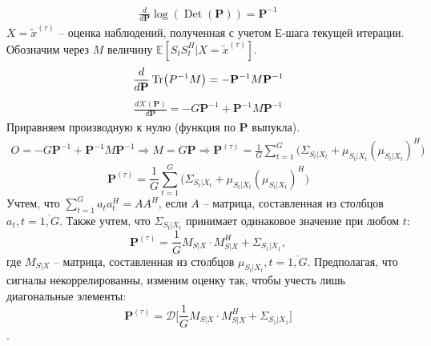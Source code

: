 \documentclass[11pt]{article}
\newcommand{\Expect}{\mathbb{E}}
\DeclareMathOperator{\Det}{Det}
\begin{document}
\begin{equation*}
\begin{gathered}
\frac{d}{d\mathbf{P}}\log (\Det (\mathbf{P})) = \mathbf{P}^{-1}
\end{gathered}
\end{equation*}
$X = \widetilde{x}^{(\tau)}$ -- оценка наблюдений, полученная с учетом Е-шага текущей итерации.
Обозначим через $M$ величину $\Expect[S_t S_t^H\Big| X = \widetilde{x}^{(\tau)}]$.
\begin{equation*}
\begin{gathered}
\frac{d}{d\mathbf{P}}\Tr(P^{-1}M)= -\mathbf{P}^{-1}M\mathbf{P}^{-1}
\end{gathered}
\end{equation*}
\begin{equation*}
\begin{gathered}
\frac{d\mathcal{K}(\mathbf{P})}{d\mathbf{P}} = -G\mathbf{P}^{-1}+\mathbf{P}^{-1}M\mathbf{P}^{-1}
\end{gathered}
\end{equation*}
Приравняем производную к нулю (функция по $\mathbf{P}$ выпукла).
\begin{equation*}
\begin{gathered}
O = -G\mathbf{P}^{-1}+\mathbf{P}^{-1}M\mathbf{P}^{-1} \Rightarrow M =G\mathbf{P} \Rightarrow \mathbf{P}^{(\tau)} = \frac{1}{G} \sum_{t=1}^G \Big( \Sigma_{S_t|X_t} +  \mu_{S_t|X_t}  (\mu_{S_t|X_t})^H \Big)
\end{gathered}
\end{equation*}
\begin{equation}
\mathbf{P}^{(\tau)} = \frac{1}{G} \sum_{t=1}^G \Big( \Sigma_{S_t|X_t} +  \mu_{S_t|X_t}  (\mu_{S_t|X_t})^H \Big)
\end{equation}
Учтем, что $\sum_{t=1}^G a_t a_t^H = AA^H$, если $A$ -- матрица, составленная из столбцов $a_t, t=\overline{1,G}$. Также учтем, что $\Sigma_{S_t|X_t}$ принимает одинаковое значение при любом $t$:
\begin{equation}
\mathbf{P}^{(\tau)} =  \frac{1}{G}  M_{S|X} \cdot M_{S|X}^H  + \Sigma_{S_1|X_1},
\end{equation}
где $M_{S|X}$ -- матрица, составленная из столбцов $\mu_{S_t|X_t}, t=\overline{1,G}$.
Предполагая, что сигналы некоррелированны, изменим оценку так, чтобы учесть лишь диагональные элементы:
\begin{equation}
\mathbf{P}^{(\tau)} =  \mathcal{D} \bigg[  \frac{1}{G} M_{S|X} \cdot M_{S|X}^H  + \Sigma_{S_1|X_1}\bigg]
\end{equation}.
\end{document}

